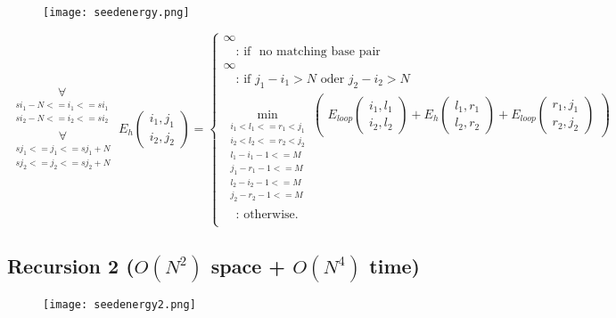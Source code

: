 \begin{figure}[H]
	\centering
	\texttt{[image: seedenergy.png]}
\end{figure}

\begin{equation*}
\substack{
  \underset{\substack{si_{1}-N <= i_{1} <= si_{1}\\si_{2}-N <= i_{2} <= si_{2}}}{\forall}\\
  \underset{\substack{sj_{1} <= j_{1} <= sj_{1}+N\\sj_{2} <= j_{2} <= sj_{2}+N}}{\forall}
}
E_h(\substack{i_1,j_1\\i_2,j_2}) = \begin{cases}
  \infty\\
  \quad\text{: if } \text{ no matching base pair }\\
  \infty\\
  \quad\text{: if } j_{1} - i_{1} > N \text{ oder } j_{2} - i_{2} > N\\
  \min\limits_{\substack{i_{1} < l_{1} <= r_{1} < j_{1}\\i_{2} < l_{2} <= r_{2} < j_{2}\\l_{1} - i_{1} - 1 <= M\\j_{1}-r_{1}-1 <= M\\l_{2} - i_{2} - 1 <= M\\j_{2}-r_{2}-1 <= M}}
  \begin{pmatrix}
	E_{loop}(\substack{i_1,l_1\\i_2,l_2}) + E_h(\substack{l_1,r_1\\l_2,r_2}) + E_{loop}(\substack{r_1,j_1\\r_2,j_2})
  \end{pmatrix}\\
  \quad\text{: otherwise.}\\
  
\end{cases}
\end{equation*}

\clearpage

\subsection{Recursion 2 ($O(N^{2})$ space + $O(N^{4})$ time)}

\begin{figure}[H]
	\centering
	\texttt{[image: seedenergy2.png]}
\end{figure}

